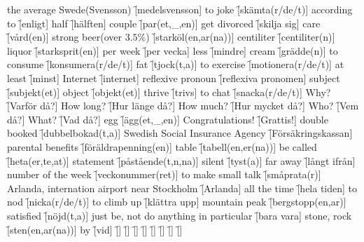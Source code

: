 \begin{questions}
    \begin{multicols}{2}
        \raggedcolumns
        \question the average Swede(Svensson) \f[medelsvensson]
        \question to joke \f[skämta(r/de/t)]
        \question according to \f[enligt]
        \question half \f[hälften]
        \question couple \f[par(et,\_,en)]
        \question get divorced \f[skilja sig]
        \question care \f[vård(en)]
        \question strong beer(over $3.5\%$) \f[starköl(en,ar(na))]
        \question centiliter \f[centiliter(n)]
        \question liquor \f[starksprit(en)]
        \question per week \f[per vecka]
        \question less \f[mindre]
        \question cream \f[grädde(n)]
        \question to consume \f[konsumera(r/de/t)]
        \question fat \f[tjock(t,a)]
        \question to exercise \f[motionera(r/de/t)]
        \question at least \f[minst]
        \question Internet \f[internet]
        \question reflexive pronoun \f[reflexiva pronomen]
        \question subject \f[subjekt(et)]
        \question object \f[objekt(et)]
        \question thrive \f[trivs]
        \question to chat \f[snacka(r/de/t)]
        \question Why? \f[Varför då?]
        \question How long? \f[Hur länge då?]
        \question How much? \f[Hur mycket då?]
        \question Who? \f[Vem då?]
        \question What? \f[Vad då?]
        \question egg \f[ägg(et,\_,en)]
        \question Congratulations! \f[Grattis!]
        \question double booked \f[dubbelbokad(t,a)]
        \question Swedish Social Insurance Agency \f[Försäkringskassan]
        \question parental benefits \f[föräldrapenning(en)]
        \question table \f[tabell(en,er(na))]
        \question be called \f[heta(er,te,at)]
        \question statement \f[påstående(t,n,na)]
        \question silent \f[tyst(a)]
        \question far away \f[långt ifrån]
        \question number of the week \f[veckonummer(ret)]
        \question to make small talk \f[småprata(r)]
        \question Arlanda, internation airport near Stockholm \f[Arlanda]
        \question all the time \f[hela tiden]
        \question to nod \f[nicka(r/de/t)]
        \question to climb up \f[klättra upp]
        \question mountain peak \f[bergstopp(en,ar)]
        \question satisfied \f[nöjd(t,a)]
        \question just be, not do anything in particular \f[bara vara]
        \question stone, rock \f[sten(en,ar(na))]
        \question by \f[vid]
        \question  \f[]
        \question  \f[]
        \question  \f[]
        \question  \f[]
        \question  \f[]
        \question  \f[]
        \question  \f[]
        \question  \f[]

\end{multicols}
\end{questions}
